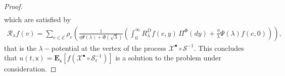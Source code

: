 \documentclass[10pt,a4paper]{amsart}
\begin{document}
\begin{proof}
\begin{align*}
			\end{align*}
			which are satisfied by
			\begin{align*}
				\mathcal{R}_\lambda f(v)= \sum_{e\in \mathcal{E}} \rho_e \left(\frac{1}{\eta \Psi(\lambda) +\Phi(\sqrt \lambda)} \left( \int_0^\infty R_\lambda^D f(e,y) \, \Pi^\Phi(dy) + \frac{\eta}{\lambda} \Psi(\lambda)f(e,0) \right)\right),
			\end{align*}
			that is the $\lambda-$potential at the vertex of the process $\mathcal{X}^\bullet \circ \mathcal{S}^{-1}$. This concludes that $u(t,\mathsf{x})=\mathbf{E}_\mathsf{x}[f(\mathcal{X}^\bullet \circ \mathcal{S}^{-1}_t)]$ is a solution to the problem under consideration.
		\end{proof}
\end{document}
